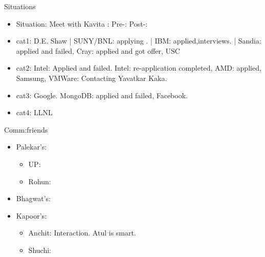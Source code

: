 \documentclass[serif, mathserif, final]{beamer}
\begin{document}
\begin{frame}
\begin{columns}
\begin{column}{0.25\linewidth}
      \begin{block}{Situations}
        \begin{itemize}


        \item \tiny Situation: Meet with Kavita : Pre-: Post-: 

        \end{itemize} 
      \end{block} 



\begin{block}
\begin{itemize}
\tiny \item \tiny cat1: 
D.E. Shaw | SUNY/BNL: applying . | IBM: applied,interviews.  | Sandia:
applied and failed, Cray: applied and got offer, USC
\item \tiny cat2:
     Intel: Applied and failed. Intel: re-application completed, AMD:
     applied, Samsung, VMWare: Contacting Yavatkar Kaka. 
\item \tiny cat3:
Google. MongoDB: applied and failed, Facebook. 
\item \tiny cat4: LLNL 
\end{itemize} 
\end{block} 


\begin{block}{Comm:friends} 
\begin{itemize} 
\item Palekar’s:  
\begin{itemize}
\item UP: 
\item Rohun: 
\end{itemize} 

\item Bhagwat’s: 

\item Kapoor’s: 
\begin{itemize}
\item \tiny Anchit: 
Interaction. Atul is smart. 
\item \tiny Shuchi: 
\end{itemize}


\end{itemize}
\end{block}
\end{column}
\end{columns}
\end{frame}
\end{document}
